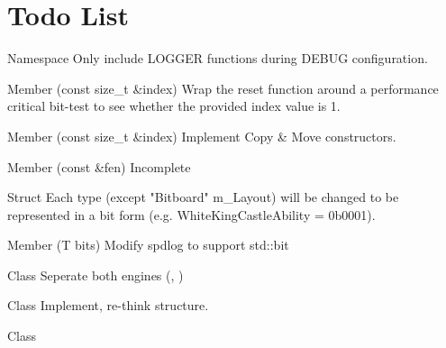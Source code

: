 \chapter{Todo List}
\hypertarget{todo}{}\label{todo}

\begin{DoxyRefList}
\item[Namespace \doxylink{namespace_chess}{Chess} ]\label{todo__todo000011}%
%
Only include LOGGER functions during DEBUG configuration.  
\item[Member \doxylink{class_chess_1_1_bitboard_aab941a568d287baf7224bec2847c80fd}{Chess\+::Bitboard\+::Reset} (const size\+\_\+t \&index)]\label{todo__todo000002}%
%
Wrap the reset function around a performance critical bit-\/test to see whether the provided index value is 1.  
\item[Member \doxylink{class_chess_1_1_bitboard_a639f1f0cba77a1b95b4c8b0bdd6a2994}{Chess\+::Bitboard\+::Set} (const size\+\_\+t \&index)]\label{todo__todo000001}%
%
Implement Copy \& Move constructors. 
\item[Member \doxylink{class_chess_1_1_board_a15ee7b2a52ae08f051407d336110fcea}{Chess\+::Board\+::Populate} (const \doxylink{class_chess_1_1_fen_string}{Fen\+String} \&fen)]\label{todo__todo000007}%
%
Incomplete  
\item[Struct \doxylink{struct_chess_1_1_board_components}{Chess\+::Board\+Components} ]\label{todo__todo000003}%
%
Each type (except "{}\+Bitboard"{} m\+\_\+\+Layout) will be changed to be represented in a bit form (e.\+g. White\+King\+Castle\+Ability = 0b0001).  
\item[Member \doxylink{namespace_chess_a3560352671dbb6913bc56621ea6bdd47}{Chess\+::display\+\_\+bits} (T bits)]\label{todo__todo000005}%
%
Modify spdlog to support std\+::bit  
\item[Class \doxylink{class_chess_1_1_engine}{Chess\+::Engine} ]\label{todo__todo000009}%
%
Seperate both engines (, ) 
\item[Class \doxylink{class_chess_1_1_evaluation}{Chess\+::Evaluation} ]\label{todo__todo000008}%
%
Implement, re-\/think structure.  
\item[Class \doxylink{class_chess_1_1_fen_string}{Chess\+::Fen\+String} ]\label{todo__todo000004}%

\end{DoxyRefList}

